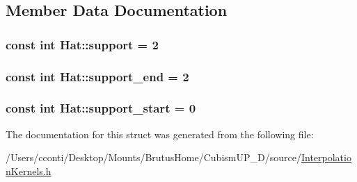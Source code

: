 \subsection{Member Data Documentation}
\hypertarget{struct_hat_a5caf232899de398d4ba47b4fca791f26}{}
\subsubsection[{support}]{\setlength{\rightskip}{0pt plus 5cm}const int Hat\+::support = 2\hspace{0.3cm}{\ttfamily [static]}}\label{struct_hat_a5caf232899de398d4ba47b4fca791f26}
\hypertarget{struct_hat_a99d8545b696b0a55e1c534b88bad9c70}{}
\subsubsection[{support\+\_\+end}]{\setlength{\rightskip}{0pt plus 5cm}const int Hat\+::support\+\_\+end = 2\hspace{0.3cm}{\ttfamily [static]}}\label{struct_hat_a99d8545b696b0a55e1c534b88bad9c70}
\hypertarget{struct_hat_a47a82b7eb958204936aae9d653b038d6}{}
\subsubsection[{support\+\_\+start}]{\setlength{\rightskip}{0pt plus 5cm}const int Hat\+::support\+\_\+start = 0\hspace{0.3cm}{\ttfamily [static]}}\label{struct_hat_a47a82b7eb958204936aae9d653b038d6}


The documentation for this struct was generated from the following file\+:\begin{DoxyCompactItemize}
\item 
/\+Users/cconti/\+Desktop/\+Mounts/\+Brutus\+Home/\+Cubism\+U\+P\+\_\+D/source/\hyperlink{_interpolation_kernels_8h}{Interpolation\+Kernels.\+h}\end{DoxyCompactItemize}
